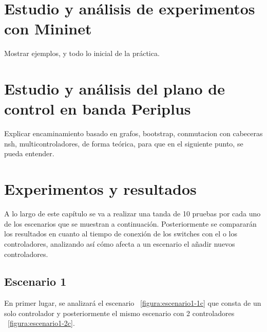 \documentclass[a4paper, 12pt]{book}
\begin{document}
	\chapter{Estudio y análisis de experimentos con Mininet} %
	\label{chap:mininet} %
	Mostrar ejemplos, y todo lo inicial de la práctica.
	
	
	\cleardoublepage %
	\chapter{Estudio y análisis del plano de control en banda Periplus} %
	\label{chap:periplus} %
	Explicar encaminamiento basado en grafos, bootstrap, conmutacion con cabeceras nsh, multicontroladores, de forma teórica, para que en el siguiente punto, se pueda entender.
	
	
	\cleardoublepage
	\chapter{Experimentos y resultados}
	\label{chap:experimentos}
	
 	A lo largo de este capítulo se va a realizar una tanda de 10 pruebas por cada uno de los escenarios que se muestran a continuación. Posteriormente se compararán los resultados en cuanto al tiempo de conexión de los switches con el o los controladores, analizando así cómo afecta a un escenario el añadir nuevos controladores.%
 	
 	\clearpage
 	\section{Escenario 1}
 	En primer lugar, se analizará el escenario ~\ref{figura:escenario1-1c} que consta de un solo controlador y posteriormente el mismo escenario con 2 controladores ~\ref{figura:escenario1-2c}.%
 	
\end{document}
